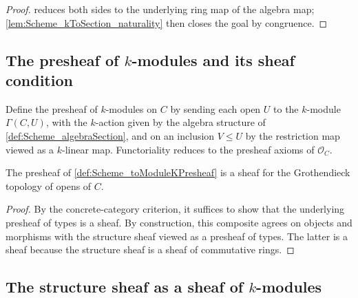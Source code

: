 \begin{proof}
  
  \leanok
   reduces both sides to the underlying ring map of the algebra map; \cref{lem:Scheme_kToSection_naturality} then closes the goal by congruence.
\end{proof}

\subsection{The presheaf of \(k\)-modules and its sheaf condition}

\begin{definition}
  \label{def:Scheme_toModuleKPresheaf}

  Define the presheaf of \(k\)-modules on \(C\) by sending each open \(U\) to the \(k\)-module \(\Gamma(C, U)\), with the \(k\)-action given by the algebra structure of \cref{def:Scheme_algebraSection}, and on an inclusion \(V \le U\) by the restriction map viewed as a \(k\)-linear map. Functoriality reduces to the presheaf axioms of \(\mathcal O_C\).
\end{definition}

\begin{theorem}
  \label{thm:Scheme_toModuleKPresheaf_isSheaf}

  The presheaf of \cref{def:Scheme_toModuleKPresheaf} is a sheaf for the Grothendieck topology of opens of \(C\).
\end{theorem}

\begin{proof}
  
  \leanok
  By the concrete-category criterion, it suffices to show that the underlying presheaf of types is a sheaf. By construction, this composite agrees on objects and morphisms with the structure sheaf viewed as a presheaf of types. The latter is a sheaf because the structure sheaf is a sheaf of commutative rings.
\end{proof}

\subsection{The structure sheaf as a sheaf of \(k\)-modules}
\label{sec:scheme_toModuleKSheaf}

